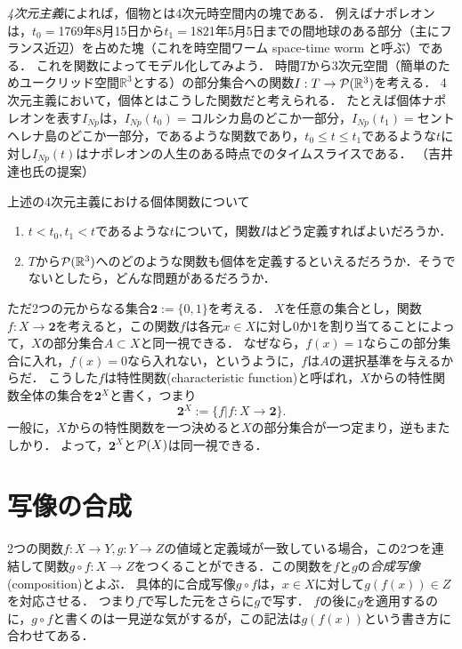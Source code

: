 \documentclass[11pt,a4paper]{jsarticle} %
\begin{document}
\begin{example}[四次元主義]
\emph{4次元主義}によれば，個物とは4次元時空間内の塊である．
例えばナポレオンは，$t_0=$1769年8月15日から$t_1=$1821年5月5日までの間地球のある部分（主にフランス近辺）を占めた塊（これを時空間ワーム space-time worm と呼ぶ）である．
これを関数によってモデル化してみよう．
時間$T$から3次元空間（簡単のためユークリッド空間$\mathbb{R}^3$とする）の部分集合への関数$I:T \to \mathcal{P}(\mathbb{R}^3)$を考える．
4次元主義において，個体とはこうした関数だと考えられる．
たとえば個体ナポレオンを表す$I_{Np}$は，$I_{Np}(t_0)=$コルシカ島のどこか一部分，$I_{Np}(t_1)=$セントヘレナ島のどこか一部分，であるような関数であり，$t_0 \leq t \leq t_1$であるような$t$に対し$I_{Np}(t)$はナポレオンの人生のある時点でのタイムスライスである．
（吉井達也氏の提案）
\end{example}

\begin{exercise}
上述の4次元主義における個体関数について
 \begin{enumerate}
  \item $t < t_0, t_1 < t$であるような$t$について，関数$I$はどう定義すればよいだろうか．
  \item $T$から$\mathcal{P}(\mathbb{R}^3)$へのどのような関数も個体を定義するといえるだろうか．そうでないとしたら，どんな問題があるだろうか．
 \end{enumerate}
\end{exercise}


\begin{develop}
ただ2つの元からなる集合$\mathbf{2} := \{0, 1\}$を考える．
$X$を任意の集合とし，関数$f:X \to \mathbf{2}$を考えると，この関数$f$は各元$x \in X$に対し0か1を割り当てることによって，$X$の部分集合$A \subset X$と同一視できる．
なぜなら，$f(x)=1$ならこの部分集合に入れ，$f(x)=0$なら入れない，というように，$f$は$A$の選択基準を与えるからだ．
こうした$f$は特性関数(characteristic function)と呼ばれ，$X$からの特性関数全体の集合を$\mathbf{2}^X$と書く，つまり
\[
 \mathbf{2}^X := \{ f|f:X \to \mathbf{2}\}.
\]
一般に，$X$からの特性関数を一つ決めると$X$の部分集合が一つ定まり，逆もまたしかり．
よって，$\mathbf{2}^X$と$\mathcal{P}(X)$は同一視できる．
\end{develop}




\section{写像の合成}
2つの関数$f:X \to Y, g:Y \to Z$の値域と定義域が一致している場合，この2つを連結して関数$g \circ f:X \to Z$をつくることができる．この関数を$f$と$g$の\emph{合成写像}(composition)とよぶ．
具体的に合成写像$g \circ f$は，$x \in X$に対して$g(f(x)) \in Z$を対応させる．
つまり$f$で写した元をさらに$g$で写す．
$f$の後に$g$を適用するのに，$g \circ f$と書くのは一見逆な気がするが，この記法は$g(f(x))$という書き方に合わせてある．
\end{document}
